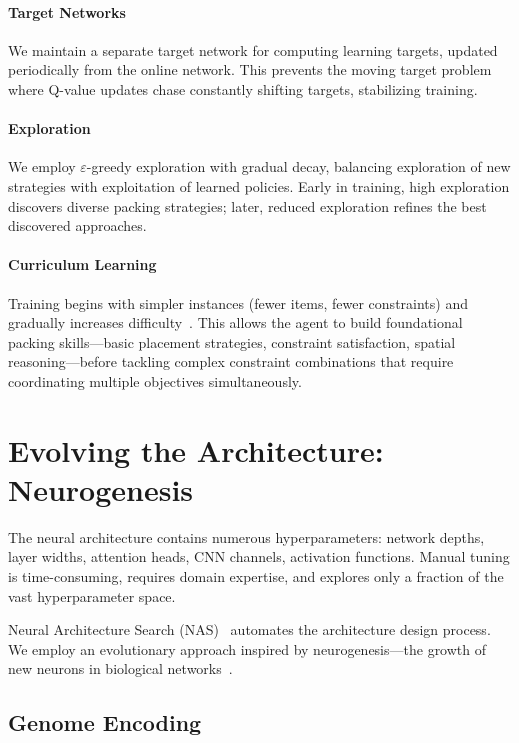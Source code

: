\paragraph{Target Networks} We maintain a separate target network for computing learning targets, updated periodically from the online network. This prevents the moving target problem where Q-value updates chase constantly shifting targets, stabilizing training.

\paragraph{Exploration} We employ $\varepsilon$-greedy exploration with gradual decay, balancing exploration of new strategies with exploitation of learned policies. Early in training, high exploration discovers diverse packing strategies; later, reduced exploration refines the best discovered approaches.

\paragraph{Curriculum Learning} Training begins with simpler instances (fewer items, fewer constraints) and gradually increases difficulty~\cite{bengio2009curriculum}. This allows the agent to build foundational packing skills—basic placement strategies, constraint satisfaction, spatial reasoning—before tackling complex constraint combinations that require coordinating multiple objectives simultaneously.

\section{Evolving the Architecture: Neurogenesis}

The neural architecture contains numerous hyperparameters: network depths, layer widths, attention heads, CNN channels, activation functions. Manual tuning is time-consuming, requires domain expertise, and explores only a fraction of the vast hyperparameter space.

Neural Architecture Search (NAS)~\cite{elsken2019neural} automates the architecture design process. We employ an evolutionary approach inspired by neurogenesis---the growth of new neurons in biological networks~\cite{kempermann2015activity}.

\subsection{Genome Encoding}

